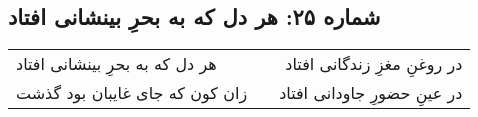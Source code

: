 \begin{center}
\section*{شماره ۲۵: هر دل که به بحرِ بینشانی افتاد}
\label{sec:025}
\begin{longtable}{l p{0.5cm} r}
هر دل که به بحرِ بینشانی افتاد
&&
در روغنِ مغزِ زندگانی افتاد
\\
زان کون که جای غایبان بود گذشت
&&
در عینِ حضورِ جاودانی افتاد
\\
\end{longtable}
\end{center}
